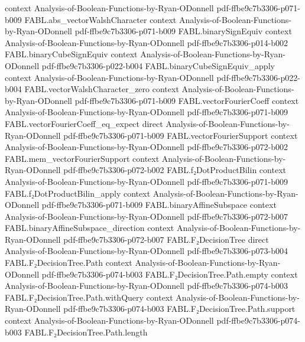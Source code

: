 \begin{theorem}
  {context}
  {Analysis-of-Boolean-Functions-by-Ryan-ODonnell}
  {pdf-ffbe9c7b3306-p071-b009}
\proofstep
  {FABL.abs_vectorWalshCharacter}
  {context}
  {Analysis-of-Boolean-Functions-by-Ryan-ODonnell}
  {pdf-ffbe9c7b3306-p071-b009}
\proofstep
  {FABL.binarySignEquiv}
  {context}
  {Analysis-of-Boolean-Functions-by-Ryan-ODonnell}
  {pdf-ffbe9c7b3306-p014-b002}
\proofstep
  {FABL.binaryCubeSignEquiv}
  {context}
  {Analysis-of-Boolean-Functions-by-Ryan-ODonnell}
  {pdf-ffbe9c7b3306-p022-b004}
\proofstep
  {FABL.binaryCubeSignEquiv_apply}
  {context}
  {Analysis-of-Boolean-Functions-by-Ryan-ODonnell}
  {pdf-ffbe9c7b3306-p022-b004}
\proofstep
  {FABL.vectorWalshCharacter_zero}
  {context}
  {Analysis-of-Boolean-Functions-by-Ryan-ODonnell}
  {pdf-ffbe9c7b3306-p071-b009}
\proofstep
  {FABL.vectorFourierCoeff}
  {context}
  {Analysis-of-Boolean-Functions-by-Ryan-ODonnell}
  {pdf-ffbe9c7b3306-p071-b009}
\proofstep
  {FABL.vectorFourierCoeff_eq_expect}
  {direct}
  {Analysis-of-Boolean-Functions-by-Ryan-ODonnell}
  {pdf-ffbe9c7b3306-p071-b009}
\proofstep
  {FABL.vectorFourierSupport}
  {context}
  {Analysis-of-Boolean-Functions-by-Ryan-ODonnell}
  {pdf-ffbe9c7b3306-p072-b002}
\proofstep
  {FABL.mem_vectorFourierSupport}
  {context}
  {Analysis-of-Boolean-Functions-by-Ryan-ODonnell}
  {pdf-ffbe9c7b3306-p072-b002}
\proofstep
  {FABL.f₂DotProductBilin}
  {context}
  {Analysis-of-Boolean-Functions-by-Ryan-ODonnell}
  {pdf-ffbe9c7b3306-p071-b009}
\proofstep
  {FABL.f₂DotProductBilin_apply}
  {context}
  {Analysis-of-Boolean-Functions-by-Ryan-ODonnell}
  {pdf-ffbe9c7b3306-p071-b009}
\proofstep
  {FABL.binaryAffineSubspace}
  {context}
  {Analysis-of-Boolean-Functions-by-Ryan-ODonnell}
  {pdf-ffbe9c7b3306-p072-b007}
\proofstep
  {FABL.binaryAffineSubspace_direction}
  {context}
  {Analysis-of-Boolean-Functions-by-Ryan-ODonnell}
  {pdf-ffbe9c7b3306-p072-b007}
\proofstep
  {FABL.F₂DecisionTree}
  {direct}
  {Analysis-of-Boolean-Functions-by-Ryan-ODonnell}
  {pdf-ffbe9c7b3306-p073-b004}
\proofstep
  {FABL.F₂DecisionTree.Path}
  {context}
  {Analysis-of-Boolean-Functions-by-Ryan-ODonnell}
  {pdf-ffbe9c7b3306-p074-b003}
\proofstep
  {FABL.F₂DecisionTree.Path.empty}
  {context}
  {Analysis-of-Boolean-Functions-by-Ryan-ODonnell}
  {pdf-ffbe9c7b3306-p074-b003}
\proofstep
  {FABL.F₂DecisionTree.Path.withQuery}
  {context}
  {Analysis-of-Boolean-Functions-by-Ryan-ODonnell}
  {pdf-ffbe9c7b3306-p074-b003}
\proofstep
  {FABL.F₂DecisionTree.Path.support}
  {context}
  {Analysis-of-Boolean-Functions-by-Ryan-ODonnell}
  {pdf-ffbe9c7b3306-p074-b003}
\proofstep
  {FABL.F₂DecisionTree.Path.length}

\end{theorem}
